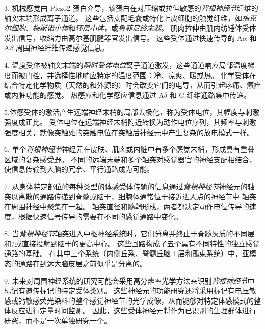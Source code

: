 3. 机械感觉由 Piezo2 蛋白介导，该蛋白在对压缩或拉伸敏感的\textit{背根神经节}纤维的轴突末端形成离子通道。
这些包括支配毛囊或特化上皮细胞的触觉纤维，如\textit{梅克尔细胞}、\textit{梅斯诺小体}和\textit{环层小体}，或\textit{鲁菲尼终末器}。
肌肉拉伸由肌内纺锤体受体发出信号，收缩力由高尔基肌腱器官发出信号。
这些受体通过快速传导的 A$\alpha$ 和 A$\beta$ 周围神经纤维传递感觉信息。


4. 温度受体被轴突末端的\textit{瞬时受体电位}离子通道激发，这些通道响应局部温度梯度而被门控，并选择性地响应特定的温度范围：冷、凉爽、暖或热。
化学受体在结合特定化学物质（天然的和外源的）时会改变它们的电导，从而引起疼痛、瘙痒或内脏功能的感觉。
热感应和化学感应信息通过 A$\delta$ 和 C 纤维通路集中传递。 


5.体感受体的激活产生远端神经末梢的局部去极化，称为受体电位，其幅度与刺激强度成正比。
受体电位在远端神经末梢附近转换为动作电位序列，其频率与刺激强度相关，就像突触处的突触电位在突触后神经元中产生复杂的放电模式一样。


6. 单个\textit{背根神经节}神经元在皮肤、肌肉或内脏中有多个感觉末梢，形成具有重叠区域的复杂感受野。
不同的远端末端和多个轴突对感觉器官的神经支配相结合，使信息传输到大脑的冗余、平行通路成为可能。 


7. 从身体特定部位的每种类型的体感受体传输的信息通过\textit{背根神经节}神经元的轴突以离散的通路传递到脊髓或脑干，细胞体通常位于接近进入点的神经节中 轴突在周围神经中聚集在一起。
轴突直径和髓鞘形成，两者都决定动作电位传导的速度，根据快速信号传导的需要在不同的感觉通路中变化。


8. 当\textit{背根神经节}轴突进入中枢神经系统时，它们分离并终止于脊髓灰质的不同层和/或直接投射到脑干的更高中心。
这些回路构成了五个具有不同特性的独立感觉通路的基础。
在其中三个系统（内侧丘系、脊髓丘脑 I 层和孤束系统）中，亚模态的通路在到达大脑皮层之前似乎是分离的。


9. 未来对周围神经系统的研究可能会采用高分辨率光学方法来识别\textit{背根神经节}中标记有遗传标记的特定受体类别。
这些神经元的功能研究还将采用标记有电压敏感或钙敏感荧光染料的整个感觉神经节的光学成像，从而能够对特定体感模式的整体反应进行定量时间监测。
因此，这些受体神经元将作为已识别的生理群体进行研究，而不是一次单独研究一个。


